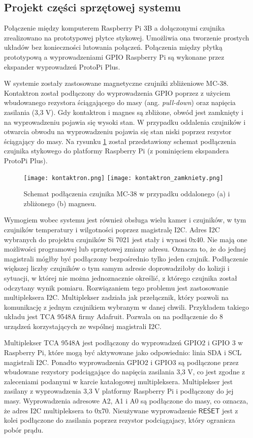 \documentclass[a4paper,11pt,twoside]{article}
\begin{document}
\subsection{Projekt części sprzętowej systemu}
Połączenie między komputerem Raspberry Pi 3B a dołączonymi czujnika zrealizowano na prototypowej płytce stykowej. Umożliwia ona tworzenie prostych układów bez konieczności lutowania połączeń. Połączenia między płytką prototypową a wyprowadzeniami GPIO Raspberry Pi są wykonane przez ekspander wyprowadzeń ProtoPi Plus.

W systemie zostały zastosowane magnetyczne czujniki zbliżeniowe MC-38. Kontaktron został podłączony do wyprowadzenia GPIO poprzez z użyciem wbudowanego rezystora ściągającego do masy (ang. \textit{pull-down}) oraz napięcia zasilania (3,3 V). Gdy kontaktron i magnes są zbliżone, obwód jest zamknięty i na wyprowadzeniu pojawia się wysoki stan. W przypadku oddalenia czujników i otwarcia obwodu na wyprowadzeniu pojawia się stan niski poprzez rezystor ściągający do masy. Na rysunku \ref{fig: kontaktron} został przedstawiony schemat podłączenia czujnika stykowego do platformy Raspberry Pi (z pominięciem ekspandera ProtoPi Plus).
\begin{figure}[h]
\texttt{[image: kontaktron.png]}
\texttt{[image: kontaktron\_zamkniety.png]}
\caption{Schemat podłączenia czujnika MC-38 w przypadku oddalonego (a) i zbliżonego (b) magnesu.}
\label{fig: kontaktron}
\end{figure}

Wymogiem wobec systemu jest również obsługa wielu kamer i czujników, w tym czujników temperatury i wilgotności poprzez magistralę I2C. Adres I2C wybranych do projektu czujników Si 7021 jest stały i wynosi 0x40. Nie mają one możliwości programowej lub sprzętowej zmiany adresu. Oznacza to, że do jednej magistrali mógłby być podłączony bezpośrednio tylko jeden czujnik. Podłączenie większej liczby czujników o tym samym adresie doprowadziłoby do kolizji i sytuacji, w której nie można jednoznacznie określić, z którego czujnika został odczytany wynik pomiaru. Rozwiązaniem tego problemu jest zastosowanie multipleksera I2C. Multiplekser zadziała jak przełącznik, który pozwoli na komunikację z jednym czujnikiem wybranym w danej chwili. Przykładem takiego układu jest TCA 9548A firmy Adafruit. Pozwala on na podłączenie do 8 urządzeń korzystających ze wspólnej magistrali I2C.

Multiplekser TCA 9548A jest podłączony do wyprowadzeń GPIO2 i GPIO 3 w Raspberry Pi, które mogą być aktywowane jako odpowiednio: linia SDA i SCL magistrali I2C. Ponadto wyprowadzenia GPIO2 i GPIO3 są podłączone przez wbudowane rezystory podciągające do napięcia zasilania 3,3 V\cite{rpi_schematic}, co jest zgodne z zaleceniami podanymi w karcie katalogowej multipleksera.\cite{multiplekser} Multiplekser jest zasilany z wyprowadzenia 3,3 V platformy Raspberry Pi i podłączony do jej masy. Wyprowadzenia adresowe A2, A1 i A0 są podłączone do masy, co oznacza, że adres I2C multipleksera to 0x70. Nieużywane wyprowadzenie $\overline{\mathsf{RESET}}$ jest z kolei podłączone do zasilania poprzez rezystor podciągajacy, który ogranicza pobór prądu.
\end{document}
